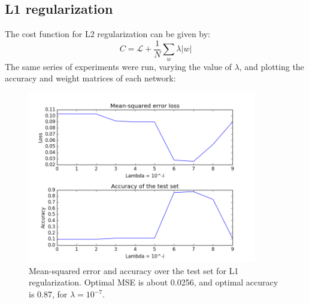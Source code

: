 \documentclass{article}
\begin{document}
\subsection{L1 regularization}
The cost function for L2 regularization can be given by:
\[
    C = \mathcal{L} + \frac{1}{N} \sum_w \lambda |w|
\] 
The same series of experiments were run, varying the value of $\lambda$, and plotting the accuracy and weight matrices of each network:

\begin{figure}[H]
    \centering
    \includegraphics[width=10cm]{mse1.png}
    \caption{Mean-squared error and accuracy over the test set for L1 regularization. Optimal MSE is about 0.0256, and optimal accuracy is 0.87, for $\lambda = 10^{-7}$.}
    \label{fig:mse1}
\end{figure}
\end{document}
